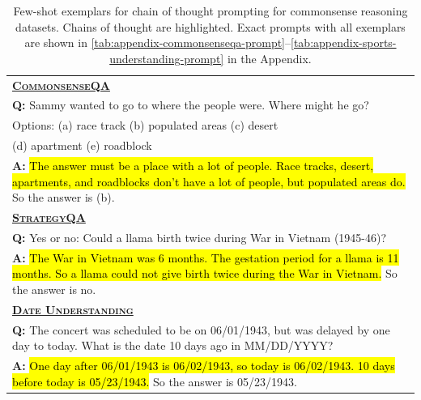 \begingroup
\begin{table}[t]
    \caption{
    Few-shot exemplars for chain of thought prompting for commonsense reasoning datasets.
    Chains of thought are highlighted.
    Exact prompts with all exemplars are shown in \cref{tab:appendix-commonsenseqa-prompt}--\cref{tab:appendix-sports-understanding-prompt} in the Appendix.
    }
    \small
    \centering
    \begin{tabular}{p{7.8cm}}
        
        \toprule
        \underline{\textbf{\textsc{CommonsenseQA}}} \\
        \vspace{-2mm}
        \textbf{Q:} Sammy wanted to go to where the people were. Where might he go? \\
        Options: \hspace{0.2cm} (a) race track \hspace{0.2cm} (b) populated areas  \hspace{0.2cm} (c) desert\\
        (d) apartment \hspace{0.2cm} (e) roadblock\\
        \vspace{-1mm}
        \textbf{A:} \hl{The answer must be a place with a lot of people. Race tracks, desert, apartments, and roadblocks don't have a lot of people, but populated areas do.} So the answer is (b). \\
        \midrule
        \underline{\textbf{\textsc{StrategyQA}}} \\
        \vspace{-2mm}
        \textbf{Q:} Yes or no: Could a llama birth twice during War in Vietnam (1945-46)? \\
        \vspace{-1mm}
        \textbf{A:} \hl{The War in Vietnam was 6 months. The gestation period for a llama is 11 months. So a llama could not give birth twice during the War in Vietnam.} So the answer is no. \\ 
        \midrule
        \underline{\textbf{\textsc{Date Understanding}}} \\
        \vspace{-2mm}
        \textbf{Q:} The concert was scheduled to be on 06/01/1943, but was delayed by one day to today. What is the date 10 days ago in MM/DD/YYYY? \\
        \vspace{-1mm}
        \textbf{A:} \hl{One day after 06/01/1943 is 06/02/1943, so today is 06/02/1943. 10 days before today is 05/23/1943.} So the answer is 05/23/1943. \\ 

\end{tabular}
\end{table}
